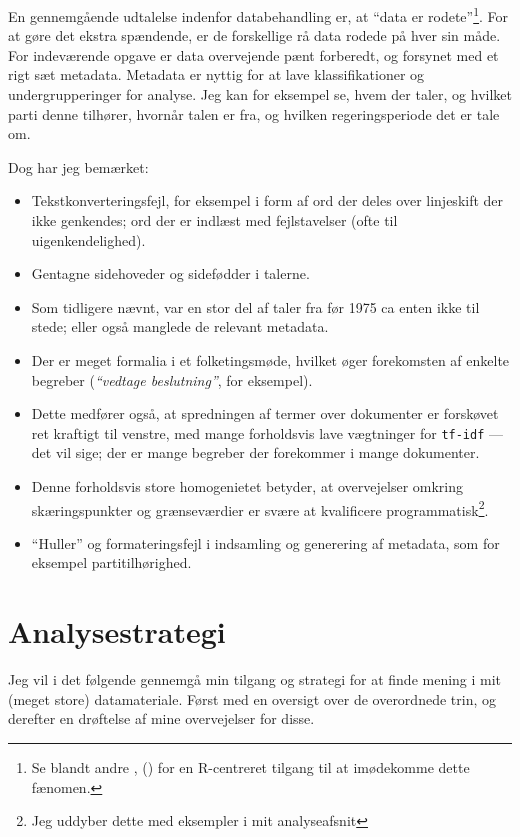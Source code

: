 En gennemgående udtalelse indenfor databehandling er, at “data er rodete”\footnote{Se blandt andre \citeauthor{wickhamTidyData2014}, (\citeyear{wickhamTidyData2014}) for en R-centreret tilgang til at imødekomme dette fænomen.}.
For at gøre det ekstra spændende, er de forskellige rå data rodede på hver sin måde.
For indeværende opgave er data overvejende pænt forberedt, og forsynet med et rigt sæt metadata.
Metadata er nyttig for at lave klassifikationer og undergrupperinger for analyse.
Jeg kan for eksempel se, hvem der taler, og hvilket parti denne tilhører, hvornår talen er fra, og hvilken regeringsperiode det er tale om.

Dog har jeg bemærket:
\begin{itemize}
  \item
    Tekstkonverteringsfejl, for eksempel i form af ord der deles over linjeskift der ikke genkendes; ord der er indlæst med fejlstavelser (ofte til uigenkendelighed).
  \item
    Gentagne sidehoveder og sidefødder i talerne.
  \item
    Som tidligere nævnt, var en stor del af taler fra før 1975 ca enten ikke til stede; eller også manglede de relevant metadata.
  \item
    Der er meget formalia i et folketingsmøde, hvilket øger forekomsten af enkelte begreber (\textit{“vedtage beslutning”}, for eksempel).
  \item
    Dette medfører også, at spredningen af termer over dokumenter er forskøvet ret kraftigt til venstre, med mange forholdsvis lave vægtninger for \texttt{tf-idf} — det vil sige; der er mange begreber der forekommer i mange dokumenter.
  \item
    Denne forholdsvis store homogenietet betyder, at overvejelser omkring skæringspunkter og grænseværdier er svære at kvalificere programmatisk\footnote{Jeg uddyber dette med eksempler i mit analyseafsnit}.
  \item
    “Huller” og formateringsfejl i indsamling og generering af metadata, som for eksempel partitilhørighed.
\end{itemize}

\chapter{Analysestrategi}\label{chap:strategy}

Jeg vil i det følgende gennemgå min tilgang og strategi for at finde mening i mit (meget store) datamateriale.
Først med en oversigt over de overordnede trin, og derefter en drøftelse af mine overvejelser for disse. 

